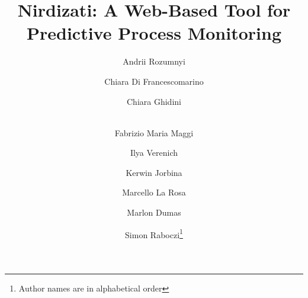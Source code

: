 \documentclass[runningheads,a4paper]{llncs}
\begin{document}
\mainmatter  %

\title{Nirdizati: A Web-Based Tool for\\ Predictive Process Monitoring}


%
%
\author{Andrii Rozumnyi  \and Chiara Di Francescomarino \and Chiara Ghidini  \and \\Fabrizio Maria Maggi \and Ilya Verenich \and Kerwin Jorbina \and Marcello La Rosa \and  Marlon Dumas \and Simon Raboczi\thanks{Author names are in alphabetical order}}


%
%

\maketitle
\end{document}
